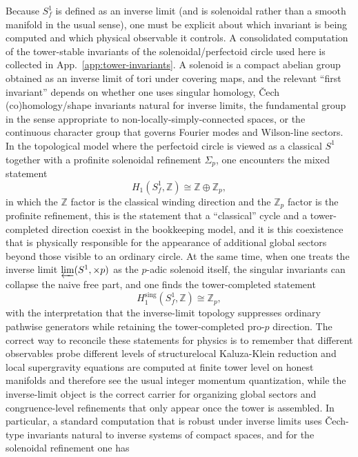 \documentclass[11pt]{article}
\theoremstyle{remark}
\newcommand{\Z}{\mathbb{Z}}
\begin{document}
Because \(S_f^1\) is defined as an inverse limit (and is solenoidal rather than a smooth manifold in the usual sense), one must be explicit about which invariant is being computed and which physical observable it controls. A consolidated computation of the tower-stable invariants of the solenoidal/perfectoid circle used here is collected in App.~\ref{app:tower-invariants}.
A solenoid is a compact abelian group obtained as an inverse limit of tori under covering maps, and the relevant ``first invariant'' depends on whether one uses singular homology, \v{C}ech (co)homology/shape invariants natural for inverse limits, the fundamental group in the sense appropriate to non-locally-simply-connected spaces, or the continuous character group that governs Fourier modes and Wilson-line sectors. In the topological model where the perfectoid circle is viewed as a classical \(S^1\) together with a profinite solenoidal refinement \(\Sigma_p\), one encounters the mixed statement
\begin{equation}\label{15}
H_1(S_f^1,\Z)\cong \Z\oplus \Z_p,
\end{equation}
in which the \(\Z\) factor is the classical winding direction and the \(\Z_p\) factor is the profinite refinement, this is the statement that a ``classical'' cycle and a tower-completed direction coexist in the bookkeeping model, and it is this coexistence that is physically responsible for the appearance of additional global sectors beyond those visible to an ordinary circle. At the same time, when one treats the inverse limit \(\varprojlim (S^1,\times p)\) as the \(p\)-adic solenoid itself, the singular invariants can collapse the naive free part, and one finds the tower-completed statement
\begin{equation}\label{17}
H^{\mathrm{sing}}_1(S_f^1,\Z)\cong \Z_p,
\end{equation}
with the interpretation that the inverse-limit topology suppresses ordinary pathwise generators while retaining the tower-completed pro-\(p\) direction. The correct way to reconcile these statements for physics is to remember that different observables probe different levels of structure\:local Kaluza-Klein reduction and local supergravity equations are computed at finite tower level on honest manifolds and therefore see the usual integer momentum quantization, while the inverse-limit object is the correct carrier for organizing global sectors and congruence-level refinements that only appear once the tower is assembled. In particular, a standard computation that is robust under inverse limits uses \v{C}ech-type invariants natural to inverse systems of compact spaces, and for the solenoidal refinement one has
\end{document}
